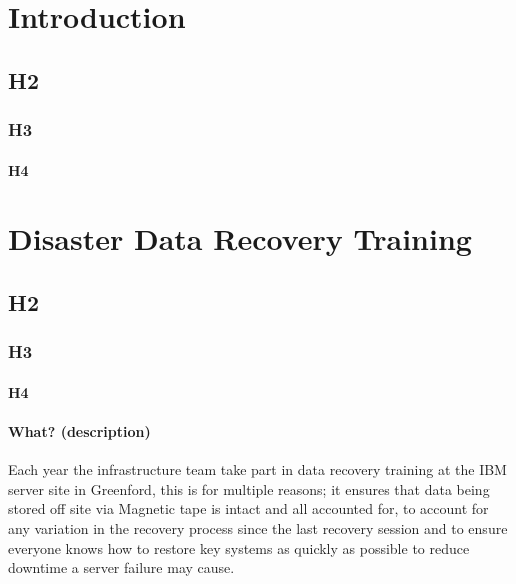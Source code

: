 \section{Introduction}\label{introduction}

\subsection{H2}\label{h2}

\subsubsection{H3}\label{h3}

\paragraph{H4}\label{h4}

\section{Disaster Data Recovery
Training}\label{disaster-data-recovery-training}

\subsection{H2}\label{h2-1}

\subsubsection{H3}\label{h3-1}

\paragraph{H4}\label{h4-1}

\paragraph{What? (description)}\label{what-description}

Each year the infrastructure team take part in data recovery training at
the IBM server site in Greenford, this is for multiple reasons; it
ensures that data being stored off site via Magnetic tape is intact and
all accounted for, to account for any variation in the recovery process
since the last recovery session and to ensure everyone knows how to
restore key systems as quickly as possible to reduce downtime a server
failure may cause.

